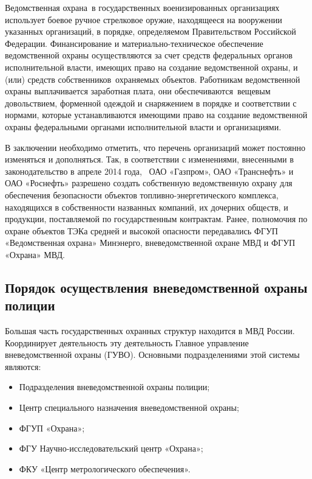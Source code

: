 \documentclass[a4paper,12pt,fleqn]{article} %
\begin{document}
Ведомственная охрана в государственных военизированных организациях использует боевое ручное стрелковое оружие, находящееся на вооружении указанных организаций, в порядке, определяемом Правительством Российской Федерации. Финансирование и материально-техническое обеспечение ведомственной охраны осуществляются за счет средств федеральных органов исполнительной власти, имеющих право на создание ведомственной охраны, и (или) средств собственников охраняемых объектов. Работникам ведомственной охраны выплачивается заработная плата, они обеспечиваются вещевым довольствием, форменной одеждой и снаряжением в порядке и соответствии с нормами, которые устанавливаются имеющими право на создание ведомственной охраны федеральными органами исполнительной власти и организациями.

В заключении необходимо отметить, что перечень организаций может постоянно изменяться и дополняться. Так, в соответствии с изменениями, внесенными в законодательство в апреле 2014 года,  ОАО «Газпром», ОАО «Транснефть» и ОАО «Роснефть» разрешено создать собственную ведомственную охрану для обеспечения безопасности объектов топливно-энергетического комплекса, находящихся в собственности названных компаний, их дочерних обществ, и продукции, поставляемой по государственным контрактам. Ранее, полномочия по охране объектов ТЭКа средней и высокой опасности передавались ФГУП «Ведомственная охрана» Минэнерго, вневедомственной охране МВД и ФГУП «Охрана» МВД. 

\subsection{Порядок осуществления вневедомственной охраны полиции}

Большая часть государственных охранных структур находится в МВД России. Координирует деятельность эту деятельность Главное управление вневедомственной охраны (ГУВО). Основными подразделениями этой системы являются:

\begin{itemize}
	\item Подразделения вневедомственной охраны полиции;
	\item Центр специального назначения вневедомственной охраны;
	\item ФГУП «Охрана»;
	\item ФГУ Научно-исследовательский центр «Охрана»;
	\item ФКУ «Центр метрологического обеспечения».
\end{itemize}
\end{document}

